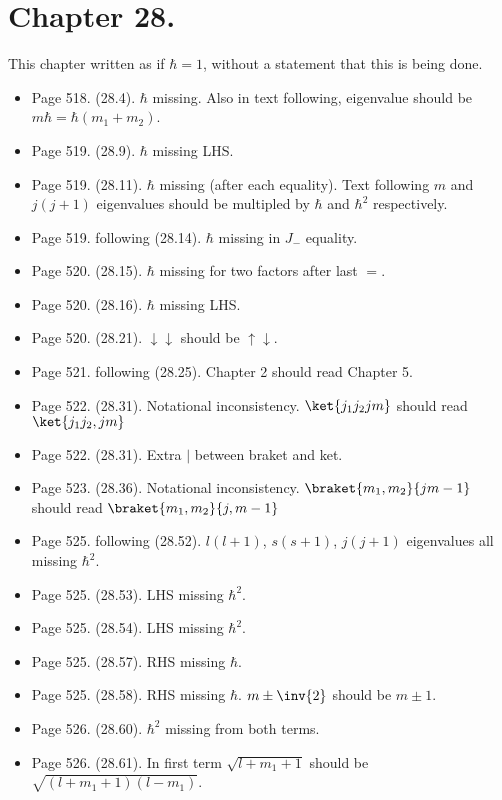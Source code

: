 \section{Chapter 28.}
This chapter written as if $\hbar = 1$, without a statement that this is being done.
\begin{itemize}
\item Page 518.  (28.4).  $\hbar$ missing.  Also in text following, eigenvalue should be $m \hbar = \hbar (m_1 + m_2)$.
\item Page 519.  (28.9).  $\hbar$ missing LHS.
\item Page 519.  (28.11).  $\hbar$ missing (after each equality).  Text following $m$ and $j(j+1)$ eigenvalues should be multipled by $\hbar$ and $\hbar^2$ respectively.
\item Page 519.  following (28.14).  $\hbar$ missing in $J_{-}$ equality.
\item Page 520.  (28.15).  $\hbar$ missing for two factors after last $=$.
\item Page 520.  (28.16).  $\hbar$ missing LHS.
\item Page 520.  (28.21).  $\downarrow \downarrow$ should be $\uparrow \downarrow$.
\item Page 521.  following (28.25).  Chapter 2 should read Chapter 5.
\item Page 522.  (28.31).  Notational inconsistency.  $\ket{j_1 j_2 jm}$ should read $\ket{j_1 j_2, j m}$
\item Page 522.  (28.31).  Extra $\vert$ between braket and ket.
\item Page 523.  (28.36).  Notational inconsistency.  $\braket{m_1, m_2}{jm -1}$ should read $\braket{m_1, m_2}{j,m -1}$ 
\item Page 525.  following (28.52).  $l(l+1)$, $s(s+1)$, $j(j+1)$ eigenvalues all missing $\hbar^2$.
\item Page 525.  (28.53).  LHS missing $\hbar^2$.
\item Page 525.  (28.54).  LHS missing $\hbar^2$.
\item Page 525.  (28.57).  RHS missing $\hbar$.
\item Page 525.  (28.58).  RHS missing $\hbar$.  $m \pm \inv{2}$ should be $m \pm 1$.
\item Page 526.  (28.60).  $\hbar^2$ missing from both terms.
\item Page 526.  (28.61).  In first term $\sqrt{l + m_1 + 1}$ should be $\sqrt{(l + m_1 + 1)(l - m_1)}$.
\end{itemize}

